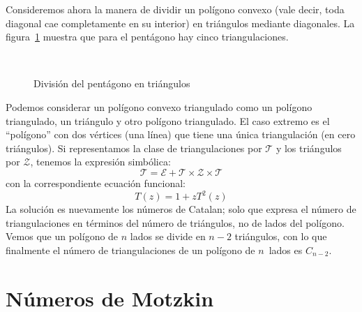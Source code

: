   Consideremos ahora la manera de dividir un polígono convexo
  (vale decir,
   toda diagonal cae completamente en su interior)
  en triángulos mediante diagonales.%
  La figura~\ref{fig:triangulations-pentagon}
  muestra que para el pentágono hay cinco triangulaciones.
  \begin{figure}[ht]
    \centering
    \hspace{2em}
    \hspace{2em}
    \\
    \hspace{2em}
    \caption{División del pentágono en triángulos}
    \label{fig:triangulations-pentagon}
  \end{figure}
  Podemos considerar un polígono convexo triangulado
  como un polígono triangulado,
  un triángulo y otro polígono triangulado.
  El caso extremo es el ``polígono'' con dos vértices
  (una línea)
  que tiene una única triangulación
  (en cero triángulos).
  Si representamos la clase de triangulaciones por \(\mathcal{T}\)
  y los triángulos por \(\mathcal{Z}\),
  tenemos la expresión simbólica:%
  \begin{equation}
    \label{eq:triangulation-se}
    \mathcal{T}
      = \mathcal{E} + \mathcal{T} \times \mathcal{Z} \times \mathcal{T}
  \end{equation}
  con la correspondiente ecuación funcional:
  \begin{equation}
    \label{eq:triangulation-fe}
    T(z)
      = 1 + z T^2(z)
  \end{equation}
  La solución es nuevamente los números de Catalan;%
  solo que expresa el número de triangulaciones
  en términos del número de triángulos,
  no de lados del polígono.
  Vemos que un polígono de \(n\) lados se divide en \(n - 2\) triángulos,
  con lo que finalmente el número de triangulaciones
  de un polígono de \(n\)~lados es \(C_{n - 2}\).

\section{Números de Motzkin}
\label{sec:numeros-motzkin}

